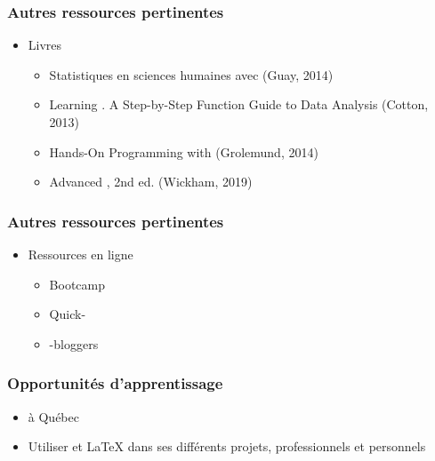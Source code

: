 \documentclass{beamer}
\begin{document}

    \begin{frame}
    
      \frametitle{Autres ressources pertinentes} \vspace{1cm}
      
       \begin{itemize}
        \item Livres
        
          \begin{itemize}
            \item Statistiques en sciences humaines avec \R (Guay, 2014)
            \item Learning \R. A Step-by-Step Function Guide to Data Analysis (Cotton, 2013)
            \item Hands-On Programming with \R (Grolemund, 2014)
            \item Advanced \R, 2nd ed. (Wickham, 2019)

        \end{itemize}
      \end{itemize}
      
     \end{frame}


    \begin{frame}
    
      \frametitle{Autres ressources pertinentes} \vspace{1cm}
      
       \begin{itemize}
       \item Ressources en ligne
       
        \begin{itemize}
          \item \R Bootcamp
          \item Quick-\R
          \item \R-bloggers

        \end{itemize}
      \end{itemize}
      
     \end{frame}
     


   \begin{frame}
    
      \frametitle{Opportunités d'apprentissage} \vspace{1cm}

        \begin{itemize}
          \item \R à Québec
          \item Utiliser \R et \LaTeX{} dans ses différents projets, professionnels et personnels
            
        \end{itemize}

     \end{frame}
\end{document}

